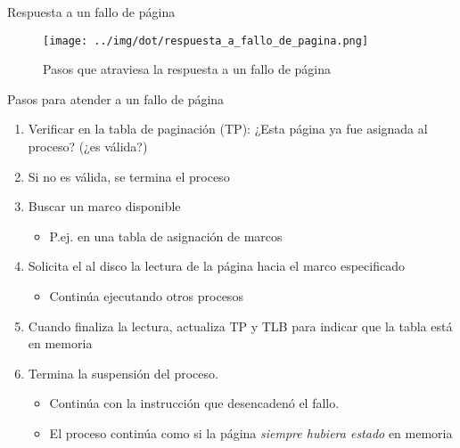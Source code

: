 \documentclass[presentation]{beamer}
\begin{document}
\begin{frame}[label={sec:org8636420}]{Respuesta a un fallo de página}
\begin{figure}[htbp]
\centering
\texttt{[image: ../img/dot/respuesta\_a\_fallo\_de\_pagina.png]}
\caption{Pasos que atraviesa la respuesta a un fallo de página}
\end{figure}
\end{frame}

\begin{frame}[label={sec:org22713b5}]{Pasos para atender a un fallo de página}
\begin{enumerate}
\item Verificar en la tabla de paginación (TP): ¿Esta página ya fue
asignada al proceso? (¿es válida?)
\item Si no es válida, se termina el proceso
\item Buscar un marco disponible
\begin{itemize}
\item P.ej. en una tabla de asignación de marcos
\end{itemize}
\item Solicita el al disco la lectura de la página hacia el marco especificado
\begin{itemize}
\item Continúa ejecutando otros procesos
\end{itemize}
\item Cuando finaliza la lectura, actualiza TP y TLB
para indicar que la tabla está en memoria
\item Termina la suspensión del proceso.
\begin{itemize}
\item Continúa con la instrucción que desencadenó el fallo.
\item El proceso continúa como si la página \emph{siempre hubiera estado} en
memoria
\end{itemize}
\end{enumerate}
\end{frame}
\end{document}
